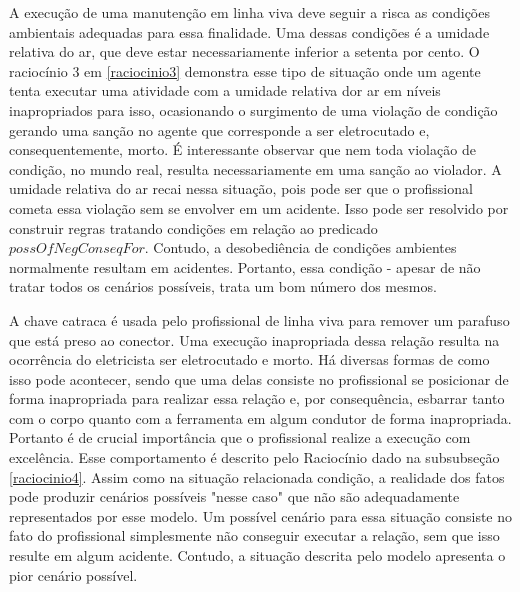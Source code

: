 A execução de uma manutenção em linha viva deve seguir a risca as condições ambientais adequadas para essa finalidade. Uma dessas condições é a umidade relativa do ar, que deve estar necessariamente inferior a setenta por cento. O raciocínio 3 em \ref{raciocinio3} demonstra esse tipo de situação onde um agente tenta executar uma atividade com a umidade relativa dor ar em níveis inapropriados para isso, ocasionando o surgimento de uma violação de condição gerando uma sanção no agente que corresponde a ser eletrocutado e, consequentemente, morto. É interessante observar que nem toda violação de condição, no mundo real, resulta necessariamente em uma sanção ao violador. A umidade relativa do ar recai nessa situação, pois pode ser que o profissional cometa essa violação sem se envolver em um acidente. Isso pode ser resolvido por construir regras tratando condições em relação ao predicado $possOfNegConseqFor$. Contudo, a desobediência de condições ambientes normalmente resultam em acidentes. Portanto, essa condição - apesar de não tratar todos os cenários possíveis, trata um bom número dos mesmos.

A chave catraca é usada pelo profissional de linha viva para remover um parafuso que está preso ao conector. Uma execução inapropriada dessa relação resulta na ocorrência do eletricista ser eletrocutado e morto. Há diversas formas de como isso pode acontecer, sendo que uma delas consiste no profissional se posicionar de forma inapropriada para realizar essa relação e, por consequência, esbarrar tanto com o corpo quanto com a ferramenta em algum condutor de forma inapropriada. Portanto é de crucial importância que o profissional realize a execução com excelência. Esse comportamento é descrito pelo Raciocínio dado na subsubseção \ref{raciocinio4}. Assim como na situação relacionada condição, a realidade dos fatos pode produzir cenários possíveis "nesse caso" que não são adequadamente representados por esse modelo. Um possível cenário para essa situação consiste no fato do profissional simplesmente não conseguir executar a relação, sem que isso resulte em algum acidente. Contudo, a situação descrita pelo modelo apresenta o pior cenário possível. 

